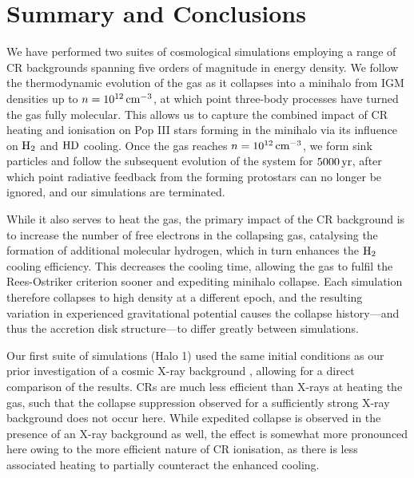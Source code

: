 \documentclass[../thesis.tex]{subfiles}
\begin{document}
\section{Summary and Conclusions}
\label{conclusions}

We have performed two suites of cosmological simulations employing a range of CR backgrounds spanning five orders of magnitude in energy density. 
We follow the thermodynamic evolution of the gas as it collapses into a minihalo from IGM densities up to $n=10^{12}\,\mathrm{cm}^{-3}$, at which point three-body processes have turned the gas fully molecular. 
This allows us to capture the combined impact of CR heating and ionisation on Pop III stars forming in the minihalo via its influence on $\mathrm{H}_2$ and $\mathrm{HD}$ cooling.
Once the gas reaches $n=10^{12}\,\mathrm{cm}^{-3}$, we form sink particles and follow the subsequent evolution of the system for $5000\,\mathrm{yr}$, after which point radiative feedback from the forming protostars can no longer be ignored, and our simulations are terminated.

While it also serves to heat the gas, the primary impact of the CR background is to increase the number of free electrons in the collapsing gas, catalysing the formation of additional molecular hydrogen, which in turn enhances the $\mathrm{H}_2$ cooling efficiency.  
This decreases the cooling time, allowing the gas to fulfil the Rees-Ostriker criterion sooner and expediting minihalo collapse. 
Each simulation therefore collapses to high density at a different epoch, and the resulting variation in experienced gravitational potential causes the collapse history---and thus the accretion disk structure---to differ greatly between simulations.

Our first suite of simulations (Halo 1) used the same initial conditions as our prior investigation of a cosmic X-ray background \citep{Hummeletal2015}, allowing for a direct comparison of the results.
CRs are much less efficient than X-rays at heating the gas, such that the collapse suppression observed for a sufficiently strong X-ray background does not occur here.  
While expedited collapse is observed in the presence of an X-ray background as well, the effect is somewhat more pronounced here owing to the more efficient nature of CR ionisation, as there is less associated heating to partially counteract the enhanced cooling.
\end{document}
